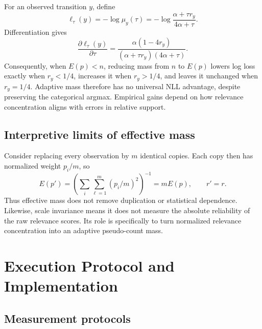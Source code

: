 \documentclass{article}
\begin{document}
For an observed transition $y$, define
\[
\ell_\tau(y)=-\log\mu_y(\tau)
=-\log\frac{\alpha+\tau r_y}{4\alpha+\tau}.
\]
Differentiation gives
\begin{equation}
\frac{\partial\ell_\tau(y)}{\partial\tau}
=\frac{\alpha(1-4r_y)}
{(\alpha+\tau r_y)(4\alpha+\tau)}.
\end{equation}
Consequently, when $E(p)<n$, reducing mass from $n$ to $E(p)$ lowers log loss exactly when $r_y<1/4$, increases it when $r_y>1/4$, and leaves it unchanged when $r_y=1/4$. Adaptive mass therefore has no universal NLL advantage, despite preserving the categorical argmax. Empirical gains depend on how relevance concentration aligns with errors in relative support.

\subsection{Interpretive limits of effective mass}

Consider replacing every observation by $m$ identical copies. Each copy then has normalized weight $p_i/m$, so
\[
E(p')=\left(\sum_i\sum_{\ell=1}^{m}(p_i/m)^2\right)^{-1}
=mE(p),
\qquad r'=r.
\]
Thus effective mass does not remove duplication or statistical dependence. Likewise, scale invariance means it does not measure the absolute reliability of the raw relevance scores. Its role is specifically to turn normalized relevance concentration into an adaptive pseudo-count mass.

\section{Execution Protocol and Implementation}
\label{app:architecture}
\label{app:protocol}

\subsection{Measurement protocols}
\end{document}
